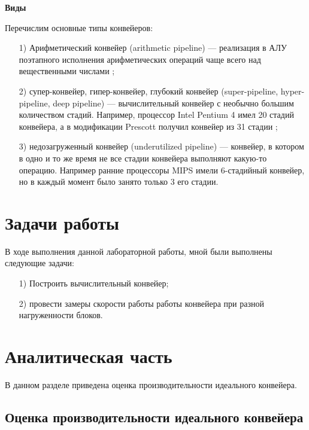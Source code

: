 \documentclass[a4paper, 14pt]{article}
\begin{document}
\begin{center}
\large\textbf{Виды}
\end{center}
 
Перечислим основные типы конвейеров:

\begin{enumerate}
\item[1)] Арифметический конвейер (arithmetic pipeline) — реализация в АЛУ поэтапного исполнения арифметических операций чаще всего над вещественными числами \cite{conveyor_ariph};
\item[2)] супер-конвейер, гипер-конвейер, глубокий конвейер (super-pipeline, hyper-pipeline, deep pipeline) — вычислительный конвейер с необычно большим количеством стадий. Например, процессор Intel Pentium 4 имел 20 стадий конвейера, а в модификации Prescott получил конвейер из 31 стадии \cite{conveyor_super};
\item[3)] недозагруженный конвейер (underutilized pipeline) — конвейер, в котором в одно и то же время не все стадии конвейера выполняют какую-то операцию. Например ранние процессоры MIPS имели 6-стадийный конвейер, но в каждый момент было занято только 3 его стадии.
\end{enumerate}

\newpage
\section*{Задачи работы}

В ходе выполнения данной лабораторной работы, мной были выполнены следующие задачи:

\begin{enumerate}
\item[1)] Построить вычислительный конвейер;
\item[2)] провести замеры скорости работы работы конвейера при разной нагруженности блоков.
\end{enumerate}


\newpage
\section{Аналитическая часть}
\hspace{1cm}	В данном разделе приведена оценка производительности идеального конвейера.

\subsection {Оценка производительности идеального конвейера} \\
\end{document}
